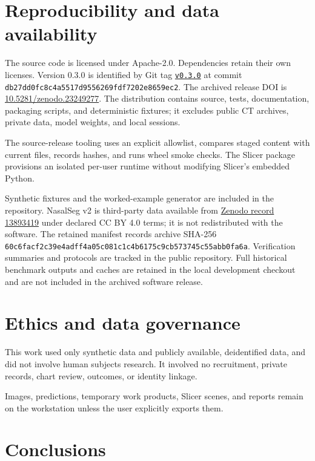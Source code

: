 \documentclass[preprint,12pt]{elsarticle}
\begin{document}
\section{Reproducibility and data availability}

The source code is licensed under Apache-2.0. Dependencies retain their own licenses. Version 0.3.0 is identified by Git tag \href{https://github.com/abachu2005/corridorkit/tree/v0.3.0}{\texttt{v0.3.0}} at commit \texttt{db27dd0f\allowbreak c8c4a551\allowbreak 7d955626\allowbreak 9fdf7202\allowbreak e8659ec2}. The archived release DOI is \href{https://doi.org/10.5281/zenodo.23249277}{10.5281/zenodo.23249277}. The distribution contains source, tests, documentation, packaging scripts, and deterministic fixtures; it excludes public CT archives, private data, model weights, and local sessions.

The source-release tooling uses an explicit allowlist, compares staged content with current files, records hashes, and runs wheel smoke checks. The Slicer package provisions an isolated per-user runtime without modifying Slicer's embedded Python.

Synthetic fixtures and the worked-example generator are included in the repository. NasalSeg v2 is third-party data available from \href{https://zenodo.org/records/13893419}{Zenodo record 13893419} under declared CC BY 4.0 terms; it is not redistributed with the software. The retained manifest records archive SHA-256 \texttt{60c6facf\allowbreak 2c39e4ad\allowbreak ff4a05c0\allowbreak 81c1c4b6\allowbreak 175c9cb5\allowbreak 73745c55\allowbreak abb0fa6a}. Verification summaries and protocols are tracked in the public repository. Full historical benchmark outputs and caches are retained in the local development checkout and are not included in the archived software release.

\section{Ethics and data governance}

This work used only synthetic data and publicly available, deidentified data, and did not involve human subjects research. It involved no recruitment, private records, chart review, outcomes, or identity linkage.

Images, predictions, temporary work products, Slicer scenes, and reports remain on the workstation unless the user explicitly exports them.

\section{Conclusions}
\end{document}
